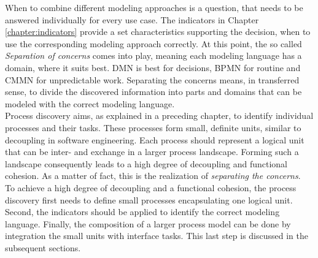 When to combine different modeling approaches is a question, that needs to be answered individually for every use case. The indicators in Chapter \ref{chapter:indicators} provide a set characteristics supporting the decision, when to use the corresponding modeling approach correctly. At this point, the so called \textit{Separation of concerns} \cite{BiardMauffBigandEtAl2015a} comes into play, meaning each modeling language has a domain, where it suits best. DMN is best for decisions, BPMN for routine and CMMN for unpredictable work. Separating the concerns means, in transferred sense, to divide the discovered information into parts and domains that can be modeled with the correct modeling language. \\
Process discovery aims, as explained in a preceding chapter, to identify individual processes and their tasks. These processes form small, definite units, similar to decoupling in software engineering. Each process should represent a logical unit that can be inter- and exchange in a larger process landscape. Forming such a landscape consequently leads to a high degree of decoupling and functional cohesion. As a matter of fact, this is the  realization of \textit{separating the concerns}. \\
To achieve a high degree of decoupling and a functional cohesion, the process discovery first needs to define small processes encapsulating one logical unit. Second, the indicators should be applied to identify the correct modeling language. Finally, the composition of a larger process model can be done by integration the small units with interface tasks. This last step is discussed in the subsequent sections. 

